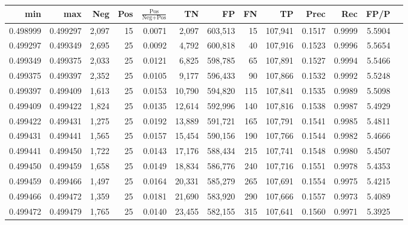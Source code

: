 \begin{tabular}{rrrrrrrrrrrrr}
\toprule
     min &      max &   Neg & Pos & $\frac{\text{Pos}}{\text{Neg}+\text{Pos}}$ &      TN &      FP &      FN &      TP &   Prec &    Rec &   FP/P \\
\midrule
0.498999 & 0.499297 & 2,097 &  15 &                                     0.0071 &   2,097 & 603,513 &      15 & 107,941 & 0.1517 & 0.9999 & 5.5904 \\
0.499297 & 0.499349 & 2,695 &  25 &                                     0.0092 &   4,792 & 600,818 &      40 & 107,916 & 0.1523 & 0.9996 & 5.5654 \\
0.499349 & 0.499375 & 2,033 &  25 &                                     0.0121 &   6,825 & 598,785 &      65 & 107,891 & 0.1527 & 0.9994 & 5.5466 \\
0.499375 & 0.499397 & 2,352 &  25 &                                     0.0105 &   9,177 & 596,433 &      90 & 107,866 & 0.1532 & 0.9992 & 5.5248 \\
0.499397 & 0.499409 & 1,613 &  25 &                                     0.0153 &  10,790 & 594,820 &     115 & 107,841 & 0.1535 & 0.9989 & 5.5098 \\
0.499409 & 0.499422 & 1,824 &  25 &                                     0.0135 &  12,614 & 592,996 &     140 & 107,816 & 0.1538 & 0.9987 & 5.4929 \\
0.499422 & 0.499431 & 1,275 &  25 &                                     0.0192 &  13,889 & 591,721 &     165 & 107,791 & 0.1541 & 0.9985 & 5.4811 \\
0.499431 & 0.499441 & 1,565 &  25 &                                     0.0157 &  15,454 & 590,156 &     190 & 107,766 & 0.1544 & 0.9982 & 5.4666 \\
0.499441 & 0.499450 & 1,722 &  25 &                                     0.0143 &  17,176 & 588,434 &     215 & 107,741 & 0.1548 & 0.9980 & 5.4507 \\
0.499450 & 0.499459 & 1,658 &  25 &                                     0.0149 &  18,834 & 586,776 &     240 & 107,716 & 0.1551 & 0.9978 & 5.4353 \\
0.499459 & 0.499466 & 1,497 &  25 &                                     0.0164 &  20,331 & 585,279 &     265 & 107,691 & 0.1554 & 0.9975 & 5.4215 \\
0.499466 & 0.499472 & 1,359 &  25 &                                     0.0181 &  21,690 & 583,920 &     290 & 107,666 & 0.1557 & 0.9973 & 5.4089 \\
0.499472 & 0.499479 & 1,765 &  25 &                                     0.0140 &  23,455 & 582,155 &     315 & 107,641 & 0.1560 & 0.9971 & 5.3925 \\

\end{tabular}
